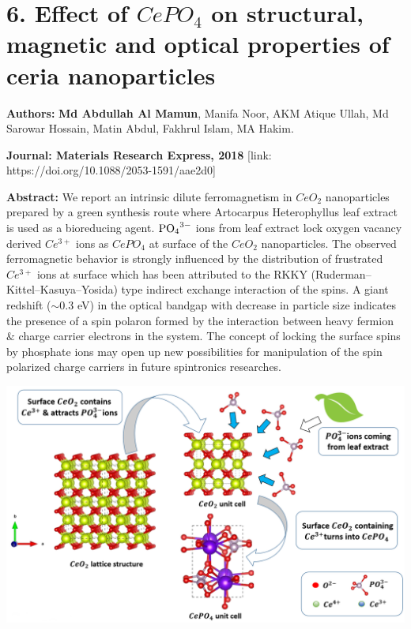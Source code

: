 \documentclass[a4paper,20pt]{article}
\begin{document}
\section{\textbf{6. Effect of $CePO_4$ on structural, magnetic and optical properties of ceria nanoparticles}}

\textbf{Authors:} \textbf{Md Abdullah Al Mamun}, Manifa Noor, AKM Atique Ullah, Md Sarowar Hossain, Matin Abdul, Fakhrul Islam, MA Hakim. \\ \vspace{3pt}

\textbf{Journal: Materials Research Express, 2018} [link: https://doi.org/10.1088/2053-1591/aae2d0] \\ \vspace{5pt}

    \begin{minipage}{.59\linewidth} \begin{flushleft}
    
    		\textbf{Abstract:} We report an intrinsic dilute ferromagnetism in $CeO_2$ nanoparticles prepared by a green synthesis route where Artocarpus Heterophyllus leaf extract is used as a bioreducing agent. ${{{\rm{PO}}}_{4}}^{3-}$ ions from leaf extract lock oxygen vacancy derived $Ce^{3+}$ ions as $CePO_4$ at surface of the $CeO_2$ nanoparticles. The observed ferromagnetic behavior is strongly influenced by the distribution of frustrated $Ce^{3+}$ ions at surface which has been attributed to the RKKY (Ruderman–Kittel–Kasuya–Yosida) type indirect exchange interaction of the spins. A giant redshift ($\sim$0.3 eV) in the optical bandgap with decrease in particle size indicates the presence of a spin polaron formed by the interaction between heavy fermion $\&$ charge carrier electrons in the system. The concept of locking the surface spins by phosphate ions may open up new possibilities for manipulation of the spin polarized charge carriers in future spintronics researches.
    	\end{flushleft} \end{minipage}
    \hfill 
    \begin{minipage}{0.4\linewidth}\begin{flushright}
    	 	\includegraphics[width=1.0\linewidth]{mrx}\\
    	\end{flushright}\end{minipage}
    	 
\end{document}
